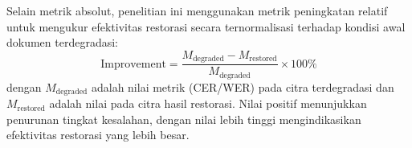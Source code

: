 Selain metrik absolut, penelitian ini menggunakan metrik peningkatan relatif untuk mengukur efektivitas restorasi secara ternormalisasi terhadap kondisi awal dokumen terdegradasi:
\begin{equation}
  \text{Improvement} = \frac{M_{\text{degraded}} - M_{\text{restored}}}{M_{\text{degraded}}} \times 100\%
  \label{eq:IV.21}
\end{equation}
dengan $M_{\text{degraded}}$ adalah nilai metrik (CER/WER) pada citra terdegradasi dan $M_{\text{restored}}$ adalah nilai pada citra hasil restorasi. Nilai positif menunjukkan penurunan tingkat kesalahan, dengan nilai lebih tinggi mengindikasikan efektivitas restorasi yang lebih besar.


